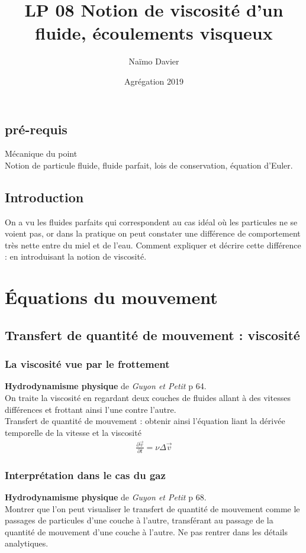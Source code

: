 \documentclass[12pt,prb,aps,epsf]{article}
\begin{document}
	
	\title{LP 08 Notion de viscosité d'un fluide, écoulements visqueux}
	\author{Naïmo Davier}
	\date{Agrégation 2019}
	
	\maketitle
	
	\tableofcontents
	
	\pagebreak
	
	
\subsection{pré-requis}	
	Mécanique du point\\
	Notion de particule fluide, fluide parfait, lois de conservation, équation d'Euler.
\subsection{Introduction}
On a vu les fluides parfaits qui correspondent au cas idéal où les particules ne se voient pas, or dans la pratique on peut constater une différence de comportement très nette entre du miel et de l'eau. Comment expliquer et décrire cette différence : en introduisant la notion de viscosité.
	
\section{Équations du mouvement}
\subsection{Transfert de quantité de mouvement : viscosité}
\subsubsection{La viscosité vue par le frottement}
\textbf{Hydrodynamisme physique} de \textit{Guyon et Petit} p 64.\\ 
On traite la viscosité en regardant deux couches de fluides allant à des vitesses différences et frottant ainsi l'une contre l'autre.\\
Transfert de quantité de mouvement : obtenir ainsi l'équation liant la dérivée temporelle de la vitesse et la viscosité 
\begin{eqnarray}
\frac{\partial \vec{v}}{\partial t} = \nu \Delta \vec{v}
\end{eqnarray}

\subsubsection{Interprétation dans le cas du gaz}
\textbf{Hydrodynamisme physique} de \textit{Guyon et Petit} p 68.\\ 
Montrer que l'on peut visualiser le transfert de quantité de mouvement comme le passages de particules d'une couche à l'autre, transférant au passage de la quantité de mouvement d'une couche à l'autre. Ne pas rentrer dans les détails analytiques.\\
\end{document}
